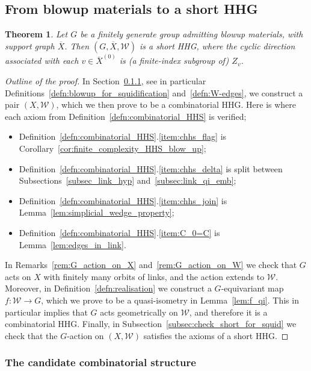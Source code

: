 \documentclass[svgnames]{amsart}
\theoremstyle{plain}
\newtheorem{thm}{Theorem}[section]
\theoremstyle{definition}
\newcommand{\ov}[1]{\overline{#1}}
\newcommand{\W}{\mathcal{W}}
\begin{document}
\subsection{From blowup materials to a short HHG}\label{subsec:squid_to_short}
\begin{thm}\label{thm:squidification}
    Let $G$ be a finitely generate group admitting blowup materials, with support graph $\ov X$. Then $(G, \ov X, \W)$ is a short HHG, where the cyclic direction associated with each $v\in\ov{X}^{(0)}$ is (a finite-index subgroup of) $Z_v$.
\end{thm}
    
    
\begin{proof}[Outline of the proof] In Section~\ref{subsec:construction_XW}, see in particular Definitions~\ref{defn:blowup_for_squidification} and~\ref{defn:W-edges}, we construct a pair $(X,\W)$, which we then prove to be a combinatorial HHG. Here is where each axiom from Definition~\ref{defn:combinatorial_HHS} is verified;
    \begin{itemize}
        \item Definition~\ref{defn:combinatorial_HHS}.\eqref{item:chhs_flag} is Corollary~\ref{cor:finite_complexity_HHS_blow_up};
        \item Definition~\ref{defn:combinatorial_HHS}.\eqref{item:chhs_delta} is split between Subsections~\ref{subsec_link_hyp} and~\ref{subsec:link_qi_emb};
        \item Definition~\ref{defn:combinatorial_HHS}.\eqref{item:chhs_join} is Lemma~\ref{lem:simplicial_wedge_property};
        \item Definition~\ref{defn:combinatorial_HHS}.\eqref{item:C_0=C} is Lemma~\ref{lem:edges_in_link}.
    \end{itemize}
    In Remarks~\ref{rem:G_action_on_X} and~\ref{rem:G_action_on_W} we check that $G$ acts on $X$ with finitely many orbits of links, and the action extends to $\W$. Moreover, in Definition~\ref{defn:realisation} we construct a $G$-equivariant map $f\colon \W\to G$, which we prove to be a quasi-isometry in Lemma~\ref{lem:f_qi}. This in particular implies that $G$ acts geometrically on $\W$, and therefore it is a combinatorial HHG. Finally, in Subsection~\ref{subsec:check_short_for_squid} we check that the $G$-action on $(X,\W)$ satisfies the axioms of a short HHG.
\end{proof}


\subsubsection{The candidate combinatorial structure}\label{subsec:construction_XW}
\end{document}
